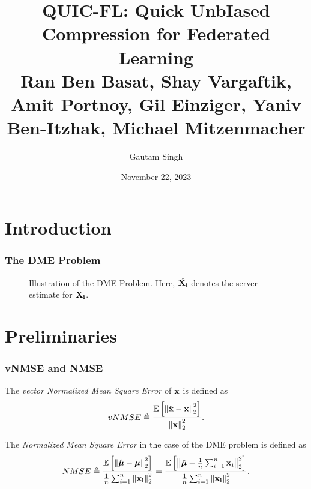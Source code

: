 \documentclass{beamer}
\title[QUIC-FL]{QUIC-FL: Quick UnbIased Compression for Federated Learning\\
\small Ran Ben Basat, Shay Vargaftik, Amit Portnoy, Gil Einziger, Yaniv Ben-Itzhak, Michael Mitzenmacher}
\date{November 22, 2023}
\author{Gautam Singh}
\institute[]{Indian Institute of Technology Hyderabad}
\begin{document}
    \maketitle
    \tableofcontents
    \section{Introduction}

    \begin{frame}
        \frametitle{The DME Problem}
        \begin{figure}[!ht]
            
            \caption{Illustration of the DME Problem. Here, \(\hat{\boldsymbol{\mathbf{X_i}}}\)
            denotes the server estimate for \(\boldsymbol{\mathbf{X_i}}\).} 
            \label{fig:dme}
        \end{figure}
    \end{frame}

    \section{Preliminaries}
    \begin{frame}
        \frametitle{vNMSE and NMSE}
        \begin{definition}[vNMSE]
        The \emph{vector Normalized Mean Square Error} of \(\boldsymbol{\mathbf{x}}\)
        is defined as
        \begin{equation}
            vNMSE \triangleq \frac{\mathbb{E}\left[ \left\lVert\hat{\boldsymbol{\mathbf{x}}}-\boldsymbol{\mathbf{x}}\right\rVert^2_2 \right]}{\left\lVert\boldsymbol{\mathbf{x}}\right\rVert^2_2}.
            \label{eq:vnmse-def}
        \end{equation}
        \end{definition}
        \begin{definition}[NMSE]
        The \emph{Normalized Mean Square Error} in the case of the DME
        problem is defined as
        \begin{equation}
            NMSE \triangleq \frac{\mathbb{E}\left[ \left\lVert\hat{\boldsymbol{\mathbf{\mu}}}-\boldsymbol{\mathbf{\mu}}\right\rVert^2_2 \right]}{\frac{1}{n}\sum_{i=1}^n\left\lVert\boldsymbol{\mathbf{x_i}}\right\rVert^2_2} = \frac{\mathbb{E}\left[ \left\lVert\hat{\boldsymbol{\mathbf{\mu}}}-\frac{1}{n}\sum_{i=1}^n\boldsymbol{\mathbf{x_i}}\right\rVert^2_2 \right]}{\frac{1}{n}\sum_{i=1}^n\left\lVert\boldsymbol{\mathbf{x_i}}\right\rVert^2_2}.
            \label{eq:nmse-def}
        \end{equation}
        \end{definition}
    \end{frame}
\end{document}
